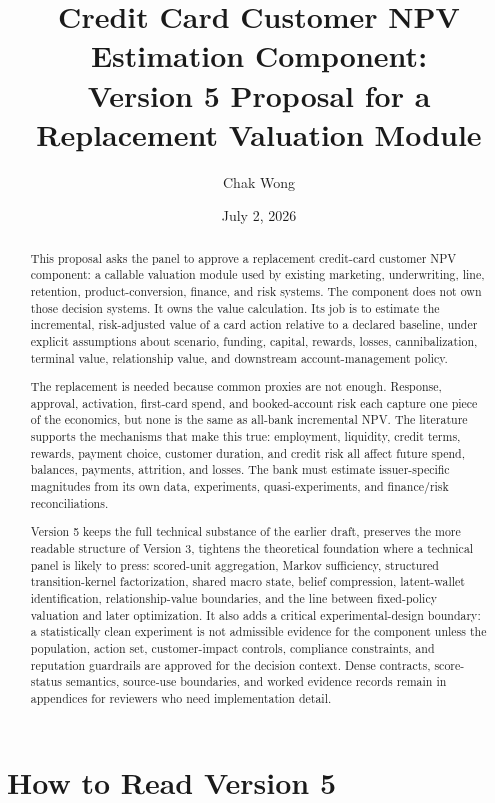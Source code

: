 \documentclass[11pt]{article}
\title{Credit Card Customer NPV Estimation Component:\\
Version 5 Proposal for a Replacement Valuation Module}
\author{Chak Wong}
\date{July 2, 2026}
\newcommand{\1}{\mathbf{1}}
\begin{document}
\maketitle

\begin{abstract}
This proposal asks the panel to approve a replacement credit-card customer NPV
component: a callable valuation module used by existing marketing,
underwriting, line, retention, product-conversion, finance, and risk systems.
The component does not own those decision systems. It owns the value
calculation. Its job is to estimate the incremental, risk-adjusted value of a
card action relative to a declared baseline, under explicit assumptions about
scenario, funding, capital, rewards, losses, cannibalization, terminal value,
relationship value, and downstream account-management policy.

The replacement is needed because common proxies are not enough. Response,
approval, activation, first-card spend, and booked-account risk each capture
one piece of the economics, but none is the same as all-bank incremental NPV.
The literature supports the mechanisms that make this true: employment,
liquidity, credit terms, rewards, payment choice, customer duration, and credit
risk all affect future spend, balances, payments, attrition, and losses. The
bank must estimate issuer-specific magnitudes from its own data, experiments,
quasi-experiments, and finance/risk reconciliations.

Version 5 keeps the full technical substance of the earlier draft, preserves
the more readable structure of Version 3, tightens the theoretical
foundation where a technical panel is likely to press: scored-unit aggregation,
Markov sufficiency, structured transition-kernel factorization, shared macro
state, belief compression, latent-wallet identification, relationship-value
boundaries, and the line between fixed-policy valuation and later optimization.
It also adds a critical experimental-design boundary: a statistically clean
experiment is not admissible evidence for the component unless the population,
action set, customer-impact controls, compliance constraints, and reputation
guardrails are approved for the decision context. Dense contracts,
score-status semantics, source-use boundaries, and worked evidence records
remain in appendices for reviewers who need implementation detail.
\end{abstract}

\section*{How to Read Version 5}
\end{document}
